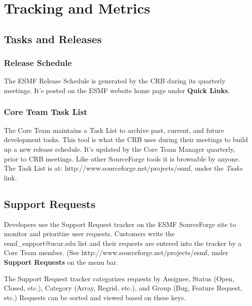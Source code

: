 
\section{Tracking and Metrics}
\label{sec:tracking}

\subsection{Tasks and Releases}
\label{sec:build}

\subsubsection{Release Schedule}
The ESMF Release Schedule is generated by the CRB during its
quarterly meetings.  It's posted on the ESMF website home
page under {\bf Quick Links}.

\subsubsection{Core Team Task List}

The Core Team maintains a Task List to archive past, current,
and future development tasks.  This tool is
what the CRB uses during their meetings to build up a new
release schedule.  It's updated by the Core Team Manager 
quarterly, prior to CRB meetings.  Like other SourceForge
tools it is browsable by anyone.  The Task List is at:  
{http://www.sourceforge.net/projects/esmf}, under the 
{\it Tasks} link. 

\subsection{Support Requests}
\label{sec:tracking_tools}

Developers use the Support Request tracker on the ESMF 
SourceForge site to monitor and prioritize user requests.
Customers write the esmf\_support@ucar.edu list and their
requests are entered into the tracker by a Core Team
member.  (See 
{http://www.sourceforge.net/projects/esmf}, under {\bf Support Requests}
on the menu bar.

The Support Request tracker categorizes requests by Assignee, 
Status (Open, Closed, etc.), Category (Array, Regrid, etc.), and
Group (Bug, Feature Request, etc.)  Requests can be sorted and
viewed based on these keys.

